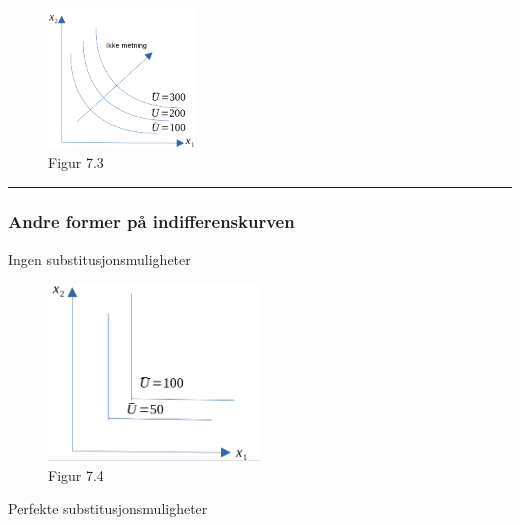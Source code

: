 \documentclass[
  letterpaper,
  DIV=11,
  numbers=noendperiod]{scrartcl}
\begin{document}
\begin{figure}[H]

{\centering \includegraphics[width=0.35\textwidth,height=\textheight]{drawio/indkart.png}

}

\caption{Figur 7.3}

\end{figure}%

\begin{center}\rule{0.5\linewidth}{0.5pt}\end{center}

\subsubsection{Andre former på
indifferenskurven}\label{andre-former-puxe5-indifferenskurven}

Ingen substitusjonsmuligheter

\begin{figure}[H]

{\centering \includegraphics[width=0.5\textwidth,height=\textheight]{drawio/subsingen.png}

}

\caption{Figur 7.4}

\end{figure}%

Perfekte substitusjonsmuligheter
\end{document}

